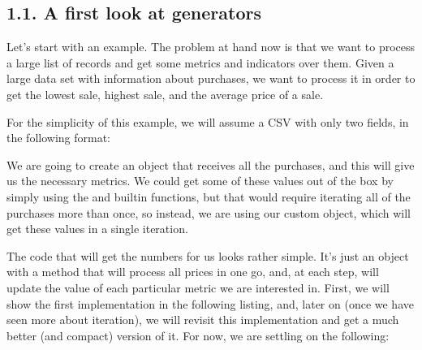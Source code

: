\documentclass[a4paper,10pt,english]{sphinxmanual}
\begin{document}
\subsection{1.1. A first look at generators}
\label{\detokenize{chapters/7_generators/index:a-first-look-at-generators}}
Let’s start with an example. The problem at hand now is that we want to process a large list
of records and get some metrics and indicators over them. Given a large data set with
information about purchases, we want to process it in order to get the lowest sale, highest
sale, and the average price of a sale.

For the simplicity of this example, we will assume a CSV with only two fields, in the
following format:

\begin{sphinxVerbatim}[commandchars=\\\{\}]
 
\end{sphinxVerbatim}

We are going to create an object that receives all the purchases, and this will give us the
necessary metrics. We could get some of these values out of the box by simply using the
 and  built\sphinxhyphen{}in functions, but that would require iterating all of the purchases
more than once, so instead, we are using our custom object, which will get these values in a
single iteration.

The code that will get the numbers for us looks rather simple. It’s just an object with a
method that will process all prices in one go, and, at each step, will update the value of each
particular metric we are interested in. First, we will show the first implementation in the
following listing, and, later on (once we have seen more about iteration), we
will revisit this implementation and get a much better (and compact) version of it. For now,
we are settling on the following:
\end{document}
